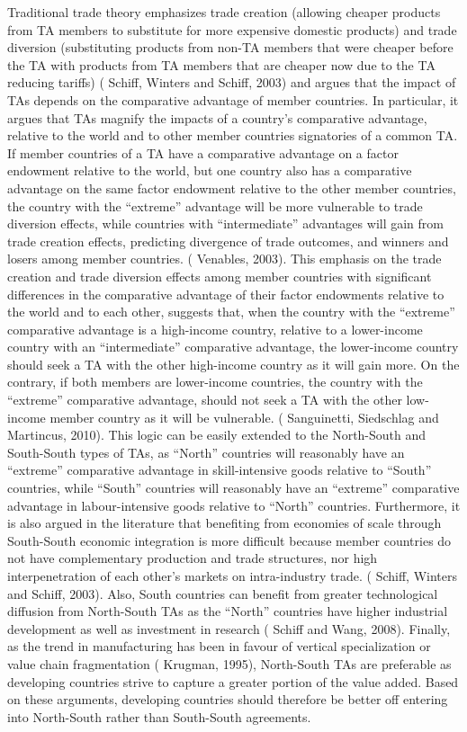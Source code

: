 \documentclass[12pt]{article}%
\begin{document}
%
Traditional trade theory emphasizes trade creation (allowing cheaper
products from TA members to substitute for more expensive domestic
products) and trade diversion (substituting products from non-TA members
that were cheaper before the TA with products from TA members that are
cheaper now due to the TA reducing tariffs) (\cite{schiff_regional_2003} Schiff, Winters and Schiff,
2003) and argues that the impact of TAs depends on the comparative
advantage of member countries. In particular, it argues that TAs magnify
the impacts of a country's comparative advantage, relative to the world
and to other member countries signatories of a common TA. If member
countries of a TA have a comparative advantage on a factor endowment
relative to the world, but one country also has a comparative advantage
on the same factor endowment relative to the other member countries, the
country with the ``extreme'' advantage will be more vulnerable to trade
diversion effects, while countries with ``intermediate'' advantages will
gain from trade creation effects, predicting divergence of trade
outcomes, and winners and losers among member countries. (\cite{venables_winners_2003} Venables,
2003). This emphasis on the trade creation and trade diversion effects
among member countries with significant differences in the comparative
advantage of their factor endowments relative to the world and to each
other, suggests that, when the country with the ``extreme'' comparative
advantage is a high-income country, relative to a lower-income country
with an ``intermediate'' comparative advantage, the lower-income country
should seek a TA with the other high-income country as it will gain
more. On the contrary, if both members are lower-income countries, the
country with the ``extreme'' comparative advantage, should not seek a TA
with the other low-income member country as it will be vulnerable.
(\cite{sanguinetti_impact_2010} Sanguinetti, Siedschlag and Martincus, 2010). This logic can be easily
extended to the North-South and South-South types of TAs, as ``North''
countries will reasonably have an ``extreme'' comparative advantage in
skill-intensive goods relative to ``South'' countries, while ``South''
countries will reasonably have an ``extreme'' comparative advantage in
labour-intensive goods relative to ``North'' countries. Furthermore, it
is also argued in the literature that benefiting from economies of scale
through South-South economic integration is more difficult because
member countries do not have complementary production and trade
structures, nor high interpenetration of each other's markets on
intra-industry trade. (\cite{schiff_regional_2003} Schiff, Winters and Schiff, 2003). Also, South
countries can benefit from greater technological diffusion from
North-South TAs as the ``North'' countries have higher industrial
development as well as investment in research (\cite{schiff_north-south_2008} Schiff and Wang, 2008).
Finally, as the trend in manufacturing has been in favour of vertical
specialization or value chain fragmentation (\cite{krugman_growing_1995} Krugman, 1995), North-South
TAs are preferable as developing countries strive to capture a greater
portion of the value added. Based on these arguments, developing
countries should therefore be better off entering into North-South
rather than South-South agreements.%
\end{document}
